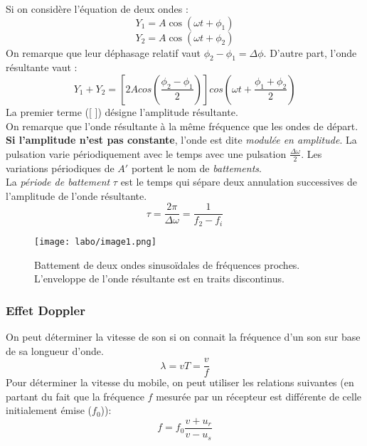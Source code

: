 \documentclass[british,french,11pt, a4paper, openany]{book}
\begin{document}
		Si on considère l'équation de deux ondes :
		\begin{equation}
			Y_1 = A\cos(\omega t + \phi_1)
			\label{y1}
		\end{equation}
		\begin{equation}
			Y_2 = A\cos(\omega t + \phi_2)
			\label{y2}
		\end{equation}
		On remarque que leur déphasage relatif vaut $\phi_2 - \phi_1 = \Delta \phi$. D'autre part, l'onde résultante vaut :
		\begin{equation}
			Y_1 + Y_2 = \left[2Acos\left(\frac{\phi_2 - \phi_1}{2}\right)\right]cos\left(\omega t + \frac{\phi_1 + \phi_2}{2}\right)
			\label{y1+y2}
		\end{equation}
		La premier terme ([ ]) désigne l'amplitude résultante. \\
		On remarque que l'onde résultante à la même fréquence que les ondes de départ.\\
		
		\textbf{Si l'amplitude n'est pas constante}, l'onde est dite \textit{modulée en amplitude}. La pulsation varie périodiquement avec le temps avec une pulsation $\frac{\Delta\omega}{2}$. Les variations périodiques de $A'$ portent le nom de \textit{battements}. \\
		La \textit{période de battement} $\tau$ est le temps qui sépare deux annulation successives de l'amplitude de l'onde résultante.
		\begin{equation}
			\tau = \frac{2\pi}{\Delta\omega} = \frac{1}{f_2 - f_i}
			\label{tau}
		\end{equation}
		
		\begin{figure}[h]
			\begin{center}
				\texttt{[image: labo/image1.png]}
			\end{center}
			\caption{Battement de deux ondes sinusoïdales de fréquences proches. L'enveloppe de l'onde résultante est en traits discontinus.}
			\label{image0}
		\end{figure}
		
		\subsubsection{Effet Doppler}
		On peut déterminer la vitesse de son si on connait la fréquence d'un son sur base de sa longueur d'onde.
		\begin{equation}
			\lambda = vT = \frac{v}{f}
			\label{lambda}
		\end{equation}
		Pour déterminer la vitesse du mobile, on peut utiliser les relations suivantes (en partant du fait que la fréquence $f$ mesurée par un récepteur est différente de celle initialement émise ($f_0$)):
		\begin{equation}
			f = f_0\frac{v + u_{r}}{v - u_{s}}
			\label{doppler}
		\end{equation}
		
\end{document}
